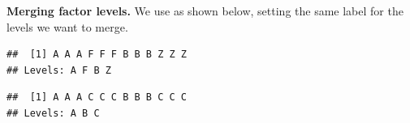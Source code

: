 \documentclass[krantz2]{krantz}\usepackage{knitr}%
\begin{document}
\begin{explainbox}
\textbf{Merging factor levels.} We use  as shown below, setting the same label for the levels we want to merge.

\begin{knitrout}\footnotesize
{}\color{fgcolor}\begin{kframe}
\begin{alltt}
 \hlkwb{<-} \hlstd{(}\hlstd{,} \hlstd{,}  \hlstd{=} \hlstd{(}\hlstd{,} \hlstd{,} \hlstd{,} \hlstd{))}
\end{alltt}
\begin{verbatim}
##  [1] A A A F F F B B B Z Z Z
## Levels: A F B Z
\end{verbatim}
\begin{alltt}
        \hlstd{=} \hlstd{(}\hlstd{,} \hlstd{,} \hlstd{,} \hlstd{),}
        \hlstd{=} \hlstd{(}\hlstd{,} \hlstd{,} \hlstd{,} \hlstd{))}
\end{alltt}
\begin{verbatim}
##  [1] A A A C C C B B B C C C
## Levels: A B C
\end{verbatim}
\end{kframe}
\end{knitrout}
\end{explainbox}
\end{document}
